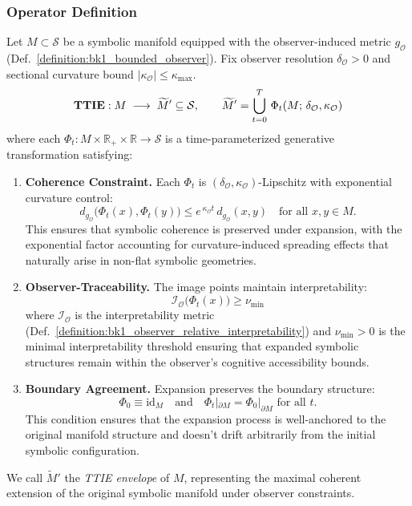 \subsubsection{Operator Definition}
\begin{definition}
\label{definition:bk4_test_time_integrative_expansion}
Let $M\subset \mathcal{S}$ be a symbolic manifold equipped with the observer-induced metric $g_{\mathcal{O}}$ (Def.~\ref{definition:bk1_bounded_observer}). Fix observer resolution $\delta_{\mathcal{O}}\!>\!0$ and sectional curvature bound $|\kappa_{\mathcal{O}}|\le \kappa_{\max}$.
\[
\text{\bf TTIE}: M\;\longrightarrow\;\widetilde{M}'\subseteq\mathcal{S},
\qquad
\widetilde{M}'=\bigcup_{t=0}^{T}\,
  \Phi_t\!\left(M;\,\delta_{\mathcal{O}},\kappa_{\mathcal{O}}\right)
\]
where each $\Phi_t: M \times \mathbb{R}_+ \times \mathbb{R} \to \mathcal{S}$ is a time-parameterized generative transformation satisfying:
\begin{enumerate}[label=\textbf{C\arabic*}]
\item \textbf{Coherence Constraint.} Each $\Phi_t$ is $(\delta_{\mathcal{O}},\kappa_{\mathcal{O}})$-Lipschitz with exponential curvature control:
\[
d_{g_{\mathcal{O}}}\!\bigl(\Phi_t(x),\Phi_t(y)\bigr)\le
e^{\,\kappa_{\mathcal{O}}t}\,d_{g_{\mathcal{O}}}(x,y)
\quad\text{for all } x,y\in M.
\]
This ensures that symbolic coherence is preserved under expansion, with the exponential factor accounting for curvature-induced spreading effects that naturally arise in non-flat symbolic geometries.

\item \textbf{Observer-Traceability.} The image points maintain interpretability:
\[
\mathcal{I}_{\mathcal{O}}\bigl(\Phi_t(x)\bigr)\ge\nu_{\min}
\]
where $\mathcal{I}_{\mathcal{O}}$ is the interpretability metric (Def.~\ref{definition:bk1_observer_relative_interpretability}) and $\nu_{\min} > 0$ is the minimal interpretability threshold ensuring that expanded symbolic structures remain within the observer's cognitive accessibility bounds.

\item \textbf{Boundary Agreement.} Expansion preserves the boundary structure:
\[
\Phi_0\equiv\mathrm{id}_M \quad \text{and} \quad
\Phi_t|_{\partial M}=\Phi_0|_{\partial M} \text{ for all } t.
\]
This condition ensures that the expansion process is well-anchored to the original manifold structure and doesn't drift arbitrarily from the initial symbolic configuration.
\end{enumerate}
We call $\widetilde{M}'$ the \emph{TTIE envelope} of $M$, representing the maximal coherent extension of the original symbolic manifold under observer constraints.
\end{definition}

